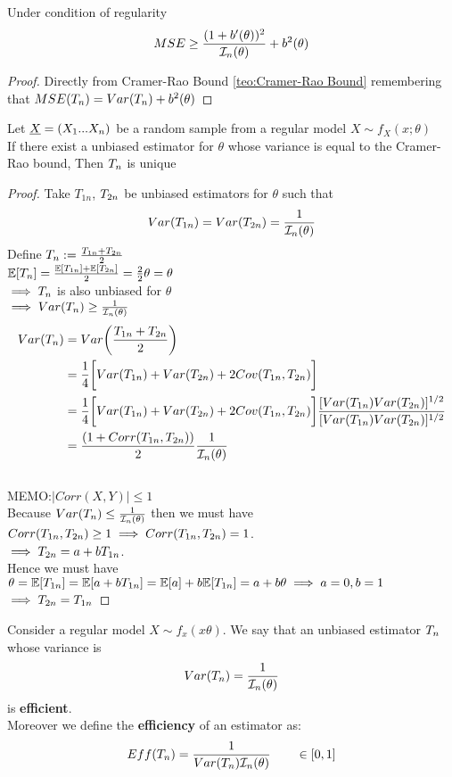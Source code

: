\begin{corol}
	Under condition of regularity
	\[MSE \geq \frac{(1+b'(\theta))^2}{\mathcal{I}_n(\theta)} +b^2(\theta) \]
\end{corol}
\begin{proof}
	Directly from Cramer-Rao Bound \ref{teo:Cramer-Rao Bound} remembering that $MSE(T_{n})=Var(T_{n})+b^2(\theta)$
\end{proof}

\begin{corol}
	Let $\underline X=(X_1... X_n)$ be a random sample from a regular model $X\sim f_X(x;\theta)$\\
	If there exist a unbiased estimator for $\theta$ whose variance is equal to the Cramer-Rao bound, Then $T_{n}$ is unique
\end{corol}
\begin{proof}
	Take $T_{1n}$, $T_{2n}$ be unbiased estimators for $\theta$ such that
	\[
	Var(T_{1n})=Var(T_{2n})=\frac{1}{\mathcal{I}_n(\theta)}
	\]
	Define $T_{n} := \frac{T_{1n} + T_{2n}}{2}$\\
	$\mathbb{E}[T_{n}]=\frac{\mathbb{E}[T_{1n}]+\mathbb{E}[T_{2n}]}{2}=\frac{2}{2}\theta=\theta$\\
	$\implies T_{n}$ is also unbiased for $\theta$\\
	$\implies Var(T_{n})\geq \frac{1}{\mathcal{I}_n(\theta)}$
	\[
	\begin{split}
	Var(T_{n})
	&=Var\bigg( \frac{T_{1n} + T_{2n}}{2}  \bigg)\\
	&=\frac{1}{4}\bigg[ Var(T_{1n})+ Var(T_{2n}) +2 Cov(T_{1n}, T_{2n}) \bigg]\\
	&=\frac{1}{4 }\bigg[ Var(T_{1n})+ Var(T_{2n}) +2 Cov(T_{1n}, T_{2n}) \bigg]\frac{[Var(T_{1n})Var(T_{2n})]^{1/2}}{[Var(T_{1n})Var(T_{2n})]^{1/2}}\\
	&=\frac{(1+Corr(T_{1n},T_{2n}))}{2}\frac{1}{\mathcal{I}_n(\theta)}
	\end{split}
	\]
	\\MEMO:$|Corr(X,Y)|\leq 1$\\
	Because $Var(T_{n})\leq\frac{1}{\mathcal{I}_n(\theta)}$ then we must have  $Corr(T_{1n},T_{2n})\geq 1 \implies Corr(T_{1n},T_{2n})= 1$.\\
	$\implies T_{2n}=a+bT_{1n}$.\\
	Hence we must have $\theta=\mathbb{E}[T_{1n}]=\mathbb{E}[a+bT_{1n}]=\mathbb{E}[a]+b\mathbb{E}[T_{1n}]=a+b\theta\implies a=0,b=1$\\
	$\implies T_{2n}=T_{1n}$
\end{proof}
\begin{defi}
	Consider a regular model $X\sim f_x(x\theta)$. We say that an unbiased estimator $T_{n}$ whose variance is 
	\[
	Var(T_{n})=\frac{1}{\mathcal{I}_n(\theta)}
	\]
	is \textbf{efficient}.\\ Moreover we define the \textbf{efficiency} of an estimator as:
	\[
	Eff(\tn)=\frac{1}{Var(\tn)\ifn} \ \ \ \ \ \ \in [0,1]
	\]
\end{defi}
